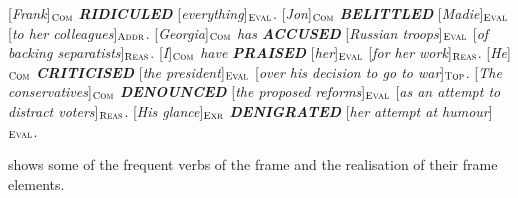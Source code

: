 \documentclass[output=paper,colorlinks,citecolor=brown]{langscibook}
\begin{document}
\begin{exe}
\ex \label{ex:06judgment}
\begin{xlist}
\ex  \label{ex:06judgment:a}
{[}\textit{Frank}{]}$_{\text{\textsc{Com}}}$ \textit{\textbf{RIDICULED}} [\textit{everything}]$_{\text{\textsc{Eval}}}$.
\ex  \label{ex:06judgment:b}
{[}\textit{Jon}{]}$_{\text{\textsc{Com}}}$ \textit{\textbf{BELITTLED}} [\textit{Madie}]$_{\text{\textsc{Eval}}}$ {[}\textit{to her colleagues}{]}$_{\text{\textsc{Addr}}}$.
\ex  \label{ex:06judgment:c}
{[}\textit{Georgia}{]}$_{\text{\textsc{Com}}}$ \textit{has \textbf{ACCUSED}} [\textit{Russian troops}]$_{\text{\textsc{Eval}}}$ [\textit{of backing separa\-tists}]$_{\text{\textsc{Reas}}}$.
\ex  \label{ex:06judgment:d}
{[}\textit{I}{]}$_{\text{\textsc{Com}}}$ \textit{have \textbf{PRAISED}} [\textit{her}]$_{\text{\textsc{Eval}}}$ [\textit{for her work}]$_{\text{\textsc{Reas}}}$.
\ex  \label{ex:06judgment:e}
{[}\textit{He}{]}$_{\text{\textsc{Com}}}$ \textit{\textbf{CRITICISED}} [\textit{the president}]$_{\text{\textsc{Eval}}}$ [\textit{over his decision to go to \linebreak war}]$_{\text{\textsc{Top}}}$.
\ex  \label{ex:06judgment:f}
{[}\textit{The conservatives}{]}$_{\text{\textsc{Com}}}$ \textit{\textbf{DENOUNCED}} {[}\textit{the proposed reforms}{]}$_{\text{\textsc{Eval}}}$ [\textit{as an attempt to distract voters}]$_{\text{\textsc{Reas}}}$.
\ex  \label{ex:06judgment:g}
{[}\textit{His glance}{]}$_{\text{\textsc{Exr}}}$ \textit{\textbf{DENIGRATED}} [\textit{her attempt at humour}]$_{\text{\textsc{Eval}}}$.
\end{xlist}
\end{exe}

 shows some of the frequent verbs of the frame and the realisation of their frame elements.
\end{document}
